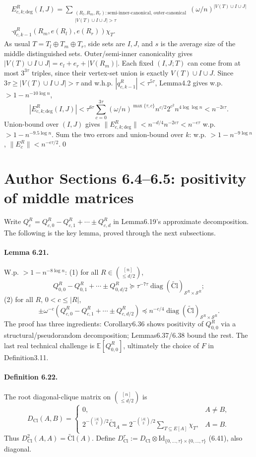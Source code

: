 \documentclass[10pt,a4paper]{article}
\begin{document}
\begin{multline*}E_{c,k;\mathrm{deg}}^R(I,J)=\sum_{\substack{(R_l,R_m,R_r):\text{semi-inner-canonical, outer-canonical}\\|V(T)\cup I\cup J|>\tau}}(\omega/n)^{|V(T)\cup I\cup J|}\\\cdot q_{c,k-1}^R(R_m,e(R_l),e(R_r))\chi_T.\end{multline*}
As usual $T=T_l\oplus T_m\oplus T_r$, side sets are $I,J$, and $s$ is the average size of the middle distinguished sets. Outer/semi-inner canonicality gives $|V(T)\cup I\cup J|=e_l+e_r+|V(R_m)|$. Each fixed $(I,J;T)$ can come from at most $3^{3\tau}$ triples, since their vertex-set union is exactly $V(T)\cup I\cup J$. Since $3\tau\ge|V(T)\cup I\cup J|>\tau$ and w.h.p. $|q_{c,k-1}^R|<\tau^{5\tau}$, Lemma4.2 gives w.p. $>1-n^{-10\log n}$,
\[|E_{c,k;\mathrm{deg}}^R(I,J)|<\tau^{6\tau}\sum_{c=0}^{3\tau}(\omega/n)^{\max\{\tau,c\}}n^{c/2}2^{c^2}n^{4\log\log n}<n^{-2\epsilon\tau}.\]
Union-bound over $(I,J)$ gives $\|E_{c,k;\mathrm{deg}}^R\|<n^{-d/4}n^{-2\epsilon\tau}<n^{-\epsilon\tau}$ w.p. $>1-n^{-9.5\log n}$. Sum the two errors and union-bound over $k$: w.p. $>1-n^{-9\log n}$, $\|E_c^R\|<n^{-\epsilon\tau/2}$.\qed

\section*{Author Sections 6.4--6.5: positivity of middle matrices}
Write $Q_c^R=Q_{c,0}^R-Q_{c,1}^R+\cdots\pm Q_{c,d}^R$ in Lemma6.19's approximate decomposition. The following is the key lemma, proved through the next subsections.
\paragraph{Lemma 6.21.} W.p. $>1-n^{-8\log n}$: (1) for all $R\in\binom{[n]}{\le d/2}$,
\[Q_{0,0}^R-Q_{0,1}^R+\cdots\pm Q_{0,d/2}^R\succeq\tau^{-7\tau}\operatorname{diag}(\widetilde{\mathrm{Cl}})_{\mathcal S^R\times\mathcal S^R};\]
(2) for all $R$, $0<c\le|R|$,
\[\pm\omega^{-c}(Q_{c,0}^R-Q_{c,1}^R+\cdots\pm Q_{c,d/2}^R)\preceq n^{-c/4}\operatorname{diag}(\widetilde{\mathrm{Cl}})_{\mathcal S^R\times\mathcal S^R}.\]
The proof has three ingredients: Corollary6.36 shows positivity of $Q_{0,0}^R$ via a structural/pseudorandom decomposition; Lemmas6.37/6.38 bound the rest. The last real technical challenge is $\mathbb E[Q_{0,0}^R]$, ultimately the choice of $F$ in Definition3.11.
\paragraph{Definition 6.22.} The root diagonal-clique matrix on $\binom{[n]}{\le d/2}$ is
\[D_{\mathrm{Cl}}(A,B)=\begin{cases}0,&A\ne B,\\2^{-\binom{|A|}2/2}\widetilde{\mathrm{Cl}}_A=2^{-\binom{|A|}2/2}\sum_{T\subseteq E[A]}\chi_T,&A=B.\end{cases}\tag{6.40}\]
Thus $D_{\mathrm{Cl}}^2(A,A)=\widetilde{\mathrm{Cl}}(A)$. Define $D_{\mathrm{Cl}}^\tau:=D_{\mathrm{Cl}}\otimes\mathrm{Id}_{\{0,\ldots,\tau\}\times\{0,\ldots,\tau\}}$ (6.41), also diagonal.
\end{document}

